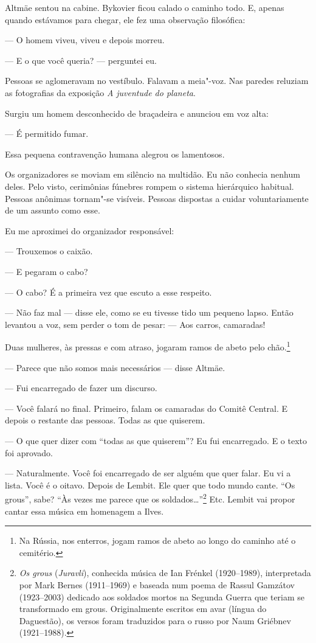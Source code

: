 Altmäe sentou na cabine. Bykovier ficou calado o caminho todo. E, apenas
quando estávamos para chegar, ele fez uma observação filosófica:

--- O homem viveu, viveu e depois morreu.

--- E o que você queria? --- perguntei eu.

Pessoas se aglomeravam no vestíbulo. Falavam a meia"-voz. Nas paredes
reluziam as fotografias da exposição \emph{A juventude do planeta}.

Surgiu um homem desconhecido de braçadeira e anunciou em voz alta:

--- É permitido fumar.

Essa pequena contravenção humana alegrou os lamentosos.

Os organizadores se moviam em silêncio na multidão. Eu não conhecia
nenhum deles. Pelo visto, cerimônias fúnebres rompem o sistema
hierárquico habitual. Pessoas anônimas tornam"-se visíveis. Pessoas
dispostas a cuidar voluntariamente de um assunto como esse.

Eu me aproximei do organizador responsável:

--- Trouxemos o caixão.

--- E pegaram o cabo?

--- O cabo? É a primeira vez que escuto a esse respeito.

--- Não faz mal --- disse ele, como se eu tivesse tido um pequeno lapso.
Então levantou a voz, sem perder o tom de pesar: --- Aos carros,
camaradas!

Duas mulheres, às pressas e com atraso, jogaram ramos de abeto pelo
chão.\footnote{Na Rússia, nos enterros, jogam ramos de abeto ao longo
  do caminho até o cemitério.}

--- Parece que não somos mais necessários --- disse Altmäe.

--- Fui encarregado de fazer um discurso.

--- Você falará no final. Primeiro, falam os camaradas do Comitê
Central. E depois o restante das pessoas. Todas as que quiserem.

--- O que quer dizer com ``todas as que quiserem''? Eu fui encarregado.
E o texto foi aprovado.

--- Naturalmente. Você foi encarregado de ser alguém que quer falar. Eu
vi a lista. Você é o oitavo. Depois de Lembit. Ele quer que todo mundo
cante. ``Os grous'', sabe? ``Às vezes me parece que os
soldados\ldots{}''\footnote{\emph{Os grous} (\emph{Juravli}),
  conhecida música de Ian Frénkel (1920--1989), interpretada por Mark
  Bernes (1911--1969) e baseada num poema de Rassul Gamzátov
  (1923--2003) dedicado aos soldados mortos na Segunda Guerra que teriam
  se transformado em grous. Originalmente escritos em avar (língua do
  Daguestão), os versos foram traduzidos para o russo por Naum Griébnev
  (1921--1988).} Etc. Lembit vai propor cantar essa música em homenagem
a Ilves.

